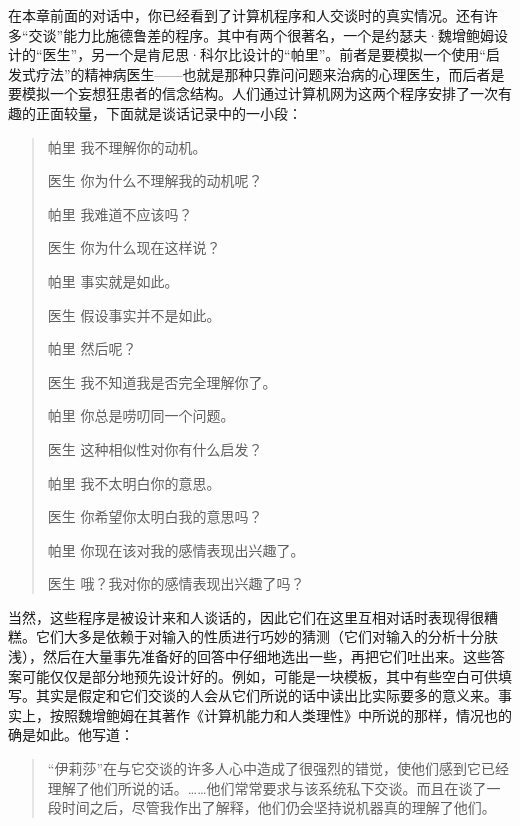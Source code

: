 在本章前面的对话中，你已经看到了计算机程序和人交谈时的真实情况。还有许多“交谈”能力比施德鲁差的程序。其中有两个很著名，一个是约瑟夫·魏增鲍姆设计的“医生”，另一个是肯尼思·科尔比设计的“帕里”。前者是要模拟一个使用“启发式疗法”的精神病医生——也就是那种只靠问问题来治病的心理医生，而后者是要模拟一个妄想狂患者的信念结构。人们通过计算机网为这两个程序安排了一次有趣的正面较量，下面就是谈话记录中的一小段：
\begin{quote}
\begin{dialogue}[labelwidth=2\ccwd,leftmargin=3\ccwd]
\item[帕里]我不理解你的动机。
\item[医生]你为什么不理解我的动机呢？
\item[帕里]我难道不应该吗？
\item[医生]你为什么现在这样说？
\item[帕里]事实就是如此。
\item[医生]假设事实并不是如此。
\item[帕里]然后呢？
\item[医生]我不知道我是否完全理解你了。
\item[帕里]你总是唠叨同一个问题。
\item[医生]这种相似性对你有什么启发？
\item[帕里]我不太明白你的意思。
\item[医生]你希望你太明白我的意思吗？
\item[帕里]你现在该对我的感情表现出兴趣了。
\item[医生]哦？我对你的感情表现出兴趣了吗？
\end{dialogue}
\end{quote}
当然，这些程序是被设计来和人谈话的，因此它们在这里互相对话时表现得很糟糕。它们大多是依赖于对输入的性质进行巧妙的猜测（它们对输入的分析十分肤浅），然后在大量事先准备好的回答中仔细地选出一些，再把它们吐出来。这些答案可能仅仅是部分地预先设计好的。例如，可能是一块模板，其中有些空白可供填写。其实是假定和它们交谈的人会从它们所说的话中读出比实际要多的意义来。事实上，按照魏增鲍姆在其著作《计算机能力和人类理性》中所说的那样，情况也的确是如此。他写道：

\begin{quote}
“伊莉莎”在与它交谈的许多人心中造成了很强烈的错觉，使他们感到它已经理解了他们所说的话。……他们常常要求与该系统私下交谈。而且在谈了一段时间之后，尽管我作出了解释，他们仍会坚持说机器真的理解了他们。
\end{quote}

